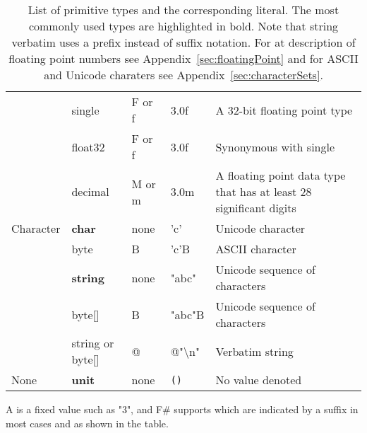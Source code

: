 \begin{table}
\begin{tabularx}{0.9\textwidth}{|l|l|l|l|X|}
             & single & F or f  & 3.0f &A 32-bit floating point type\\
             &float32 & F or f  & 3.0f &Synonymous with single\\
             &decimal &M or m & 3.0m &A floating point data type that has at least 28 significant digits\\
    \hline
    Character &\textbf{char} & none  & 'c' &Unicode character\\
             &byte & B  & 'c'B & ASCII character\\
             &\textbf{string} & none  & "abc" & Unicode sequence of characters\\
             &byte[] & B  & "abc"B & Unicode sequence of characters\\
             &string or byte[] & @  & @"\textbackslash n" & Verbatim string\\
    \hline
    None &\textbf{unit} &none & \texttt{()} & No value denoted\\
    \hline
  \end{tabularx}
  \caption{List of primitive types and the corresponding literal. The most commonly used types are highlighted in bold. Note that string verbatim uses a prefix instead of suffix notation. For at description of floating point numbers see Appendix~\ref{sec:floatingPoint} and for ASCII and Unicode charaters see Appendix~\ref{sec:characterSets}.}
  \label{tab:primitiveTypes}
\end{table}
A  is a fixed value such as "3", and F\# supports  which are indicated by a suffix in most cases and as shown in the table.

